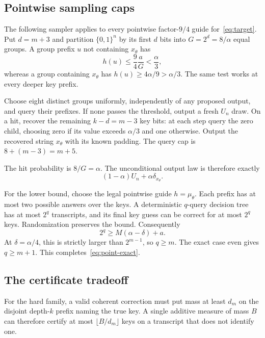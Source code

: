 \documentclass[11pt]{article}
\theoremstyle{definition}\newtheorem{definition}[theorem]{Definition}
\theoremstyle{remark}\newtheorem{remark}[theorem]{Remark}
\newcommand{\bits}{\{0,1\}}
\begin{document}
\subsection{Pointwise sampling caps}\label{sec:pointwise}
The following sampler applies to every pointwise factor-$9/4$ guide for~\eqref{eq:target}. Put $d=m+3$ and partition $\bits^n$ by its first $d$ bits into $G=2^d=8/\alpha$ equal groups. A group prefix $u$ not containing $x_\theta$ has
\[
 h(u)\le\frac94\frac aG<\frac\alpha3,
\]
whereas a group containing $x_\theta$ has $h(u)\ge4\alpha/9>\alpha/3$. The same test works at every deeper key prefix.

Choose eight distinct groups uniformly, independently of any proposed output, and query their prefixes. If none passes the threshold, output a fresh $U_n$ draw. On a hit, recover the remaining $k-d=m-3$ key bits: at each step query the zero child, choosing zero if its value exceeds $\alpha/3$ and one otherwise. Output the recovered string $x_\theta$ with its known padding. The query cap is $8+(m-3)=m+5$.

The hit probability is $8/G=\alpha$. The unconditional output law is therefore exactly
\[
 (1-\alpha)U_n+\alpha\delta_{x_\theta}.
\]


For the lower bound, choose the legal pointwise guide $h=\mu_\theta$. Each prefix has at most two possible answers over the keys. A deterministic $q$-query decision tree has at most $2^q$ transcripts, and its final key guess can be correct for at most $2^q$ keys. Randomization preserves the bound. Consequently
\begin{equation}\label{eq:binary-lower}
 2^q\ge M(\alpha-\delta)+a.
\end{equation}
At $\delta=\alpha/4$, this is strictly larger than $2^{m-1}$, so $q\ge m$. The exact case even gives $q\ge m+1$. This completes~\eqref{eq:point-exact}.

\subsection{The certificate tradeoff}\label{sec:certification}
For the hard family, a valid coherent correction must put mass at least $d_m$ on the disjoint depth-$k$ prefix naming the true key. A single additive measure of mass $B$ can therefore certify at most $\lfloor B/d_m\rfloor$ keys on a transcript that does not identify one.
\end{document}
